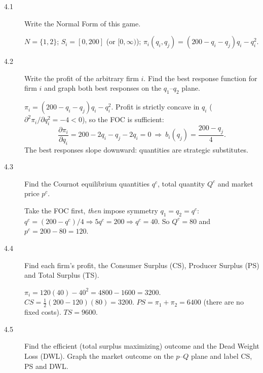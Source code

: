 \begin{description}
\item[4.1] Write the Normal Form of this game.
\begin{solution}
$N=\{1,2\}$; $S_i=[0,200]$ (or $[0,\infty)$); $\pi_i(q_i,q_j)=(200-q_i-q_j)q_i-q_i^2$.
\end{solution}
\item[4.2] Write the profit of the arbitrary firm $i$. Find the best response function for firm $i$ and graph both best responses on the $q_1$--$q_2$ plane.
\begin{solution}
$\pi_i=(200-q_i-q_j)q_i-q_i^2$. Profit is strictly concave in $q_i$ ($\partial^2\pi_i/\partial q_i^2=-4<0$), so the FOC is sufficient:
\[\frac{\partial\pi_i}{\partial q_i}=200-2q_i-q_j-2q_i=0\ \Longrightarrow\ b_i(q_j)=\frac{200-q_j}{4}.\]
The best responses slope downward: quantities are strategic substitutes.
\begin{center}
\end{center}
\end{solution}
\item[4.3] Find the Cournot equilibrium quantities $q^c$, total quantity $Q^c$ and market price $p^c$.
\begin{solution}
Take the FOC first, \emph{then} impose symmetry $q_1=q_2=q^c$: $q^c=(200-q^c)/4\Rightarrow 5q^c=200\Rightarrow q^c=40$. So $Q^c=80$ and $p^c=200-80=120$.
\end{solution}
\item[4.4] Find each firm's profit, the Consumer Surplus (CS), Producer Surplus (PS) and Total Surplus (TS).
\begin{solution}
$\pi_i=120(40)-40^2=4800-1600=3200$.
$CS=\tfrac12(200-120)(80)=3200$.
$PS=\pi_1+\pi_2=6400$ (there are no fixed costs).
$TS=9600$.
\end{solution}
\item[4.5] Find the efficient (total surplus maximizing) outcome and the Dead Weight Loss (DWL). Graph the market outcome on the $p$--$Q$ plane and label CS, PS and DWL.

\end{description}
